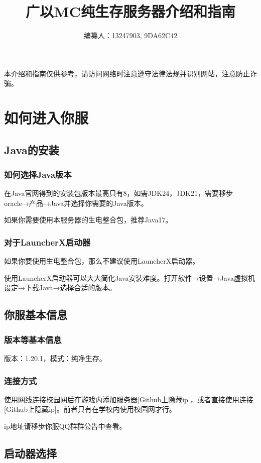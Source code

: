 \documentclass[UTF8,a4paper]{article}
\title{广以MC纯生存服务器介绍和指南}
\author{编纂人：13247903, 9DA62C42}
\begin{document}
	\maketitle
	\tableofcontents
	\newpage
	\par 本介绍和指南仅供参考，请访问网络时注意遵守法律法规并识别网站，注意防止诈骗。
	\section{如何进入你服}
		\subsection{Java的安装}
			\subsubsection{如何选择Java版本}
				\par 在Java官网得到的安装包版本最高只有8，如需JDK24，JDK21，需要移步oracle→产品→Java并选择你需要的Java版本。
				\par 如果你需要使用本服务器的生电整合包，推荐Java17。
			\subsubsection{对于LauncherX启动器}
				\par 如果你要使用生电整合包，那么不建议使用LauncherX启动器。
				\par 使用LauncherX启动器可以大大简化Java安装难度。打开软件→设置→Java虚拟机设定→下载Java→选择合适的版本。
		\subsection{你服基本信息}
			\subsubsection{版本等基本信息}
				\par 版本：1.20.1，模式：纯净生存。
			\subsubsection{连接方式}
				\par 使用网线连接校园网后在游戏内添加服务器[Github上隐藏ip]，或者直接使用连接[Github上隐藏ip]。前者只有在学校内使用校园网才行。
				\par ip地址请移步你服QQ群群公告中查看。
		\subsection{启动器选择}
\end{document}
